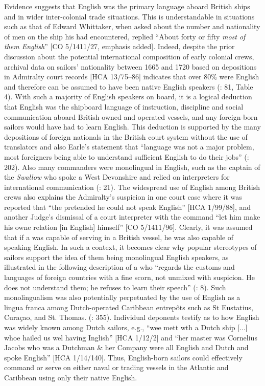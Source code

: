   Evidence suggests that English was the primary language aboard British ships and in wider inter-colonial trade situations. This is understandable in situations such as that of Edward Whittaker, when asked about the number and nationality of men on the ship his  had encountered, replied “About forty or fifty \textit{most of them English}” [CO 5/1411/27, emphasis added]. Indeed, despite the prior discussion about the potential international composition of early colonial crews, archival data on sailors’ nationality between 1665 and 1720 based on depositions in Admiralty court records [HCA 13/75–86] indicates that over 80\% were English and therefore can be assumed to have been native English speakers (\citealt{Earle1993}: 81, Table 4). With such a majority of English speakers on board, it is a logical deduction that English was the shipboard language of instruction, discipline and social communication aboard British owned and operated vessels, and any foreign-born sailors would have had to learn English. This deduction is supported by the many depositions of foreign nationals in the British court system without the use of translators and also Earle’s statement that “language was not a major problem, most foreigners being able to understand sufficient English to do their jobs” (\citeyear*{Earle1998}: 202). Also many commanders were monolingual in English, such as the captain of the \textit{Swallow} who spoke a West Devonshire  and relied on interpreters for international communication (\citealt{Earle1998}: 21). The widespread use of English among British crews also explains the Admiralty’s suspicion in one court case where it was reported that “the  pretended he could not speak English” [HCA 1/99/88], and another Judge’s dismissal of a court interpreter with the command “let him make his owne relation [in English] himself” [CO 5/1411/96]. Clearly, it was assumed that if a  was capable of serving in a British vessel, he was also capable of speaking English.  In such a context, it becomes clear why popular stereotypes of sailors support the idea of them being monolingual English speakers, as illustrated in the following description of a  who “regards the customs and languages of foreign countries with a fine scorn, not unmixed with suspicion. He does not understand them; he refuses to learn their speech” (\citealt{FoxSmith1924}: 8). Such monolingualism was also potentially perpetuated by the use of English as a lingua franca among Dutch-operated Caribbean entrepôts such as St Eustatius, Curaçao, and St. Thomas. (\citealt{Jarvis2010}: 355). Individual deponents testify as to how English was widely known among Dutch sailors, e.g., “wee mett wth a Dutch ship [...] whoe hailed us wel having Inglish” [HCA 1/12/2] and “her master was Cornelius Jacobs who was a Dutchman \& her Company were all English and Dutch and spoke English” [HCA 1/14/140]. Thus, English-born sailors could effectively command or serve on either naval or trading vessels in the Atlantic and Caribbean using only their native English. 

